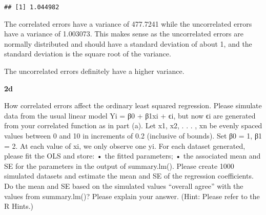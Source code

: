 \documentclass[
]{article}
\begin{document}
\begin{verbatim}
## [1] 1.044982
\end{verbatim}

The correlated errors have a variance of 477.7241 while the uncorrelated
errors have a variance of 1.003073. This makes sense as the uncorrelated
errors are normally distributed and should have a standard deviation of
about 1, and the standard deviation is the square root of the variance.

The uncorrelated errors definitely have a higher variance.

\textbf{2d}

How correlated errors affect the ordinary least squared regression.
Please simulate data from the usual linear model Yi = β0 + β1xi + ϵi,
but now ϵi are generated from your correlated function as in part (a).
Let x1, x2, . . . , xn be evenly spaced values between 0 and 10 in
increments of 0.2 (inclusive of bounds). Set β0 = 1, β1 = 2. At each
value of xi, we only observe one yi. For each dataset generated, please
fit the OLS and store: • the fitted parameters; • the associated mean
and SE for the parameters in the output of summary.lm(). Please create
1000 simulated datasets and estimate the mean and SE of the regression
coefficients. Do the mean and SE based on the simulated values ``overall
agree'' with the values from summary.lm()? Please explain your answer.
(Hint: Please refer to the R Hints.)
\end{document}
